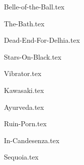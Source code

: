 \begin{songs}{}

  {Belle-of-the-Ball.tex}
  \sclearpage
  
  {The-Bath.tex}
  \sclearpage
  
  {Dead-End-For-Delhia.tex}
  \sclearpage
  
  {Stars-On-Black.tex}
  \sclearpage
  
  {Vibrator.tex}
  \sclearpage
  
  {Kawasaki.tex}
  \sclearpage
  
  {Ayurveda.tex}
  \sclearpage
  
  {Ruin-Porn.tex}
  \sclearpage
  
  {In-Candesenza.tex}
  \sclearpage
  
  {Sequoia.tex}
  \sclearpage
  
\end{songs}
